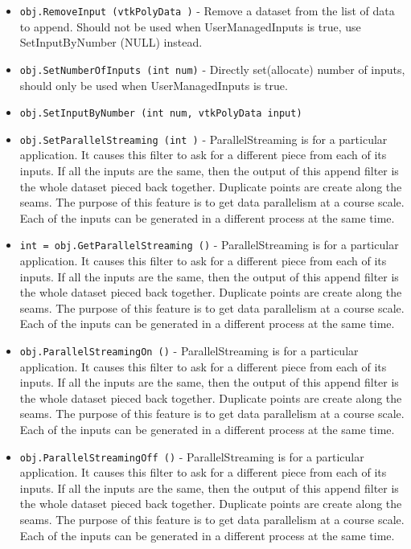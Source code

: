 \begin{itemize}
\item  \verb|obj.RemoveInput (vtkPolyData )| -  Remove a dataset from the list of data to append. Should not be
 used when UserManagedInputs is true, use SetInputByNumber (NULL) instead.

\item  \verb|obj.SetNumberOfInputs (int num)| -  Directly set(allocate) number of inputs, should only be used
 when UserManagedInputs is true.

\item  \verb|obj.SetInputByNumber (int num, vtkPolyData input)|

\item  \verb|obj.SetParallelStreaming (int )| -  ParallelStreaming is for a particular application.
 It causes this filter to ask for a different piece
 from each of its inputs.  If all the inputs are the same,
 then the output of this append filter is the whole dataset
 pieced back together.  Duplicate points are create 
 along the seams.  The purpose of this feature is to get 
 data parallelism at a course scale.  Each of the inputs
 can be generated in a different process at the same time.

\item  \verb|int = obj.GetParallelStreaming ()| -  ParallelStreaming is for a particular application.
 It causes this filter to ask for a different piece
 from each of its inputs.  If all the inputs are the same,
 then the output of this append filter is the whole dataset
 pieced back together.  Duplicate points are create 
 along the seams.  The purpose of this feature is to get 
 data parallelism at a course scale.  Each of the inputs
 can be generated in a different process at the same time.

\item  \verb|obj.ParallelStreamingOn ()| -  ParallelStreaming is for a particular application.
 It causes this filter to ask for a different piece
 from each of its inputs.  If all the inputs are the same,
 then the output of this append filter is the whole dataset
 pieced back together.  Duplicate points are create 
 along the seams.  The purpose of this feature is to get 
 data parallelism at a course scale.  Each of the inputs
 can be generated in a different process at the same time.

\item  \verb|obj.ParallelStreamingOff ()| -  ParallelStreaming is for a particular application.
 It causes this filter to ask for a different piece
 from each of its inputs.  If all the inputs are the same,
 then the output of this append filter is the whole dataset
 pieced back together.  Duplicate points are create 
 along the seams.  The purpose of this feature is to get 
 data parallelism at a course scale.  Each of the inputs
 can be generated in a different process at the same time.

\end{itemize}
